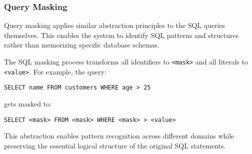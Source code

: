 \subsubsection{Query Masking}

Query masking applies similar abstraction principles to the SQL queries themselves.
This enables the system to identify SQL patterns and structures rather than
memorizing specific database schemas.

The SQL masking process transforms all identifiers to \texttt{<mask>} and all literals
to \texttt{<value>}. For example, the query:

\begin{verbatim}
SELECT name FROM customers WHERE age > 25
\end{verbatim}

gets masked to:

\begin{verbatim}
SELECT <mask> FROM <mask> WHERE <mask> > <value>
\end{verbatim}

This abstraction enables pattern recognition across different domains while
preserving the essential logical structure of the original SQL statements.
